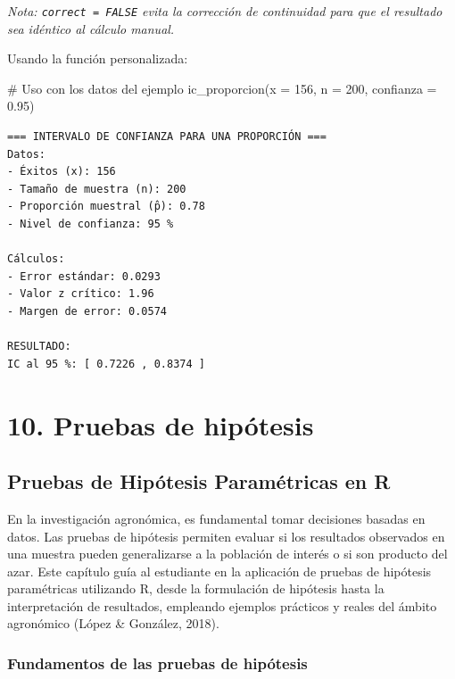 \documentclass[
  spanish,
  letterpaper,
]{book}
\newenvironment{Shaded}{\begin{snugshade}}{\end{snugshade}}
\newcommand{\AttributeTok}[1]{\textcolor[rgb]{0.40,0.45,0.13}{#1}}
\newcommand{\CommentTok}[1]{\textcolor[rgb]{0.37,0.37,0.37}{#1}}
\newcommand{\DecValTok}[1]{\textcolor[rgb]{0.68,0.00,0.00}{#1}}
\newcommand{\FloatTok}[1]{\textcolor[rgb]{0.68,0.00,0.00}{#1}}
\newcommand{\FunctionTok}[1]{\textcolor[rgb]{0.28,0.35,0.67}{#1}}
\newcommand{\NormalTok}[1]{\textcolor[rgb]{0.00,0.23,0.31}{#1}}
\begin{document}
\emph{Nota: \texttt{correct\ =\ FALSE} evita la corrección de
continuidad para que el resultado sea idéntico al cálculo manual.}

Usando la función personalizada:

\begin{Shaded}
\begin{Highlighting}[]
\CommentTok{\# Uso con los datos del ejemplo}
\FunctionTok{ic\_proporcion}\NormalTok{(}\AttributeTok{x =} \DecValTok{156}\NormalTok{,}
              \AttributeTok{n =} \DecValTok{200}\NormalTok{, }
              \AttributeTok{confianza =} \FloatTok{0.95}\NormalTok{)}
\end{Highlighting}
\end{Shaded}

\begin{verbatim}
=== INTERVALO DE CONFIANZA PARA UNA PROPORCIÓN ===
Datos:
- Éxitos (x): 156 
- Tamaño de muestra (n): 200 
- Proporción muestral (p̂): 0.78 
- Nivel de confianza: 95 %

Cálculos:
- Error estándar: 0.0293 
- Valor z crítico: 1.96 
- Margen de error: 0.0574 

RESULTADO:
IC al 95 %: [ 0.7226 , 0.8374 ]
\end{verbatim}

\part{10. Pruebas de hipótesis}


\chapter{Pruebas de Hipótesis Paramétricas en
R}\label{pruebas-de-hipuxf3tesis-paramuxe9tricas-en-r}

En la investigación agronómica, es fundamental tomar decisiones basadas
en datos. Las pruebas de hipótesis permiten evaluar si los resultados
observados en una muestra pueden generalizarse a la población de interés
o si son producto del azar. Este capítulo guía al estudiante en la
aplicación de pruebas de hipótesis paramétricas utilizando R, desde la
formulación de hipótesis hasta la interpretación de resultados,
empleando ejemplos prácticos y reales del ámbito agronómico (López \&
González, 2018).

\section{Fundamentos de las pruebas de
hipótesis}\label{fundamentos-de-las-pruebas-de-hipuxf3tesis}
\end{document}
